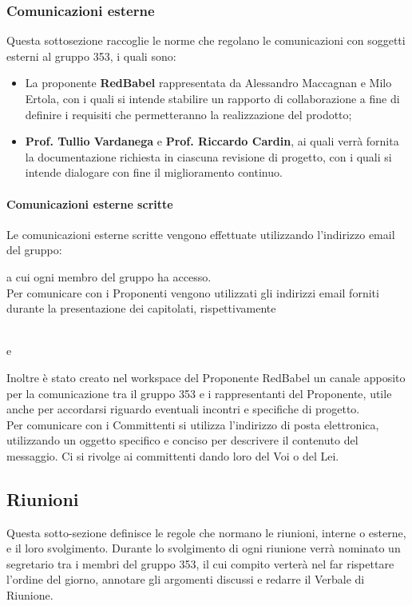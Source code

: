 \documentclass[NormeDiProgetto.tex]{subfiles}
\begin{document}
	\subsubsection{Comunicazioni esterne}
	Questa sottosezione raccoglie le norme che regolano le comunicazioni con soggetti esterni al gruppo 353, i quali sono:
	\begin{itemize}
		\item La proponente \textbf{RedBabel} rappresentata da Alessandro Maccagnan e Milo Ertola, con i quali si intende stabilire un rapporto di collaborazione a fine di definire i requisiti che permetteranno la realizzazione del prodotto;
		\item \textbf{Prof. Tullio Vardanega} e \textbf{Prof. Riccardo Cardin}, ai quali verrà fornita la documentazione richiesta in ciascuna revisione di progetto, con i quali si intende dialogare con fine il miglioramento continuo.
	\end{itemize}
	\paragraph{Comunicazioni esterne scritte}
	Le comunicazioni esterne scritte vengono effettuate utilizzando l'indirizzo email del gruppo:
	\begin{center}
		\mailleaf
	\end{center}
	a cui ogni membro del gruppo ha accesso.\\
	Per comunicare con i Proponenti vengono utilizzati gli indirizzi email forniti durante la presentazione dei capitolati, rispettivamente 
	\begin{center}
		 \\
		e\\
		
	\end{center}
	Inoltre è stato creato nel workspace  del Proponente RedBabel un canale apposito per la comunicazione tra il gruppo 353 e i rappresentanti del Proponente, utile anche per accordarsi riguardo eventuali incontri e specifiche di progetto.\\
	Per comunicare con i Committenti si utilizza l'indirizzo di posta elettronica, utilizzando un oggetto specifico e conciso per descrivere il contenuto del messaggio. Ci si rivolge ai committenti dando loro del Voi o del Lei.
	
	\subsection{Riunioni}
	Questa sotto-sezione definisce le regole che normano le riunioni, interne o esterne, e il loro svolgimento. Durante lo svolgimento di ogni riunione verrà nominato un segretario tra i membri del gruppo 353, il cui compito verterà nel far rispettare l'ordine del giorno, annotare gli argomenti discussi e redarre il Verbale di Riunione.
\end{document}
